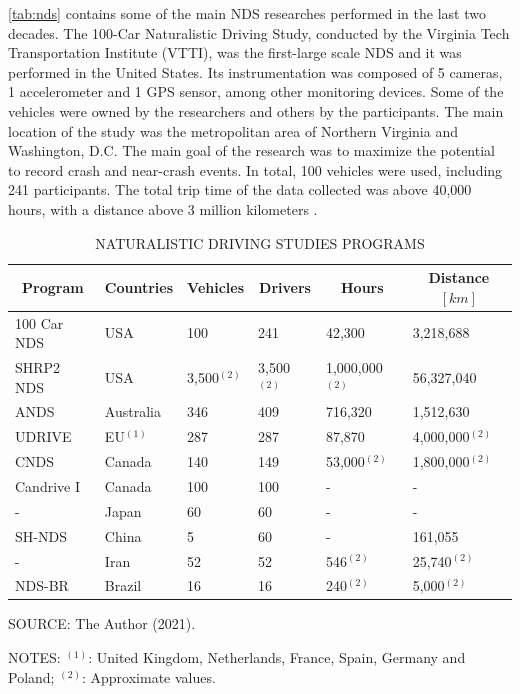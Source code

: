 \autoref{tab:nds} contains some of the main NDS researches performed in the last two decades. The 100-Car Naturalistic Driving Study, conducted by the Virginia Tech Transportation Institute (VTTI), was the first-large scale NDS and it was performed in the United States. Its instrumentation was composed of 5 cameras, 1 accelerometer and 1 GPS sensor, among other monitoring devices. Some of the vehicles were owned by the researchers and others by the participants. The main location of the study was the metropolitan area of Northern Virginia and Washington, D.C. The main goal of the research was to maximize the potential to record crash and near-crash events. In total, 100 vehicles were used, including 241 participants. The total trip time of the data collected was above 40,000 hours, with a distance above 3 million kilometers \cite{Neale2005}.

\begin{table}[!hbtp]
    \footnotesize
    \captionsetup{justification=raggedright,
        singlelinecheck=false,
        font=footnotesize}
    \caption{NATURALISTIC DRIVING STUDIES PROGRAMS}
    \centering
    \begin{tabular}{llllll}
        \hline
        \multicolumn{1}{c}{\textbf{Program}} & \multicolumn{1}{c}{\textbf{Countries}} & \multicolumn{1}{c}{\textbf{Vehicles}} & \multicolumn{1}{c}{\textbf{Drivers}} & \multicolumn{1}{c}{\textbf{Hours}} & \multicolumn{1}{c}{\textbf{Distance} $[km]$} \\
        \hline
        100 Car NDS & USA        & 100 & 241 & 42,300 & 3,218,688 \\
        SHRP2 NDS   & USA        & 3,500$^{(2)}$ & 3,500$^{(2)}$ & 1,000,000$^{(2)}$ & 56,327,040 \\
        ANDS        & Australia  & 346 & 409 & 716,320 & 1,512,630 \\
        UDRIVE      & EU$^{(1)}$ & 287 & 287 & 87,870 & 4,000,000$^{(2)}$ \\
        CNDS        & Canada     & 140 & 149 & 53,000$^{(2)}$ & 1,800,000$^{(2)}$ \\
        Candrive I  & Canada     & 100 & 100 & - & - \\
        -           & Japan      & 60  & 60  & - & - \\
        SH-NDS      & China      & 5   & 60  & - & 161,055 \\
        -           & Iran       & 52  & 52  & 546$^{(2)}$ & 25,740$^{(2)}$ \\
        NDS-BR      & Brazil     & 16  & 16  & 240$^{(2)}$ & 5,000$^{(2)}$ \\ 
        \hline
    \end{tabular}
    \label{tab:nds}
    \par \vspace{2mm} \footnotesize \raggedright
    SOURCE: The Author (2021).
    \par \vspace{1mm} \footnotesize \raggedright
    NOTES: $^{(1)}$: United Kingdom, Netherlands, France, Spain, Germany and Poland; $^{(2)}$: Approximate values.
\end{table}

